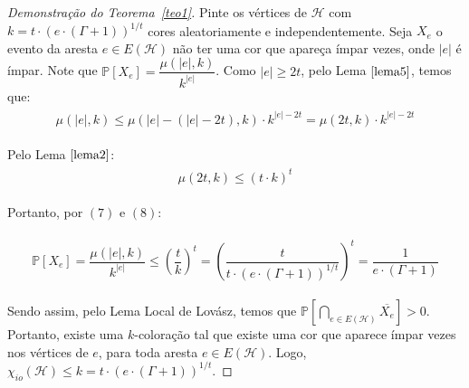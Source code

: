 \begin{proof}[Demonstração do Teorema~\ref{teo1}]
	Pinte os vértices de $\mathcal{H}$ com $k = t {\cdot} (e {\cdot} (\Gamma + 1))^{1/t}$ cores aleatoriamente e independentemente. Seja $X_{e}$ o evento da aresta $e \in E(\mathcal{H})$ não ter uma cor que apareça ímpar vezes, onde $|e|$ é ímpar. Note que $\mathds{P}[X_{e}] = \dfrac{\mu(|e|, k)}{k^{|e|}}$. Como $|e| \geq 2t$, pelo Lema $\ref{lema5}$, temos que: 
	\begin{align}
		\begin{split}
			\mu(|e|, k) \leq \mu(|e| - (|e| - 2t), k) {\cdot} k^{|e| - 2t} = \mu(2t, k) {\cdot} k^{|e| - 2t}
		\end{split} 
	\end{align} 
	
	Pelo Lema $\ref{lema2}$:
	\begin{align}
		\begin{split}
			\mu(2t, k) \leq (t {\cdot } k)^t
		\end{split} 
	\end{align} 
	
	Portanto, por $(7)$ e $(8)$:
	
	\begin{align}
		\begin{split}
			\mathds{P}[X_{e}] = \dfrac{\mu(|e|, k)}{k^{|e|}} 
			\leq \left(\dfrac{t}{k}\right)^t  = \left(\dfrac{t}{t {\cdot}   (e {\cdot} (\Gamma + 1))^{1/t}}\right)^t = \dfrac{1}{e {\cdot} (\Gamma + 1)}
		\end{split} 
	\end{align}
	
	Sendo assim, pelo Lema Local de Lovász, temos que $\mathds{P}[\bigcap\limits_{e \in E(\mathcal{H})} \overline{X_{e}} ] > 0$. Portanto, existe uma $k$-coloração tal que existe uma cor que aparece ímpar vezes nos vértices de $e$, para toda aresta $e \in E(\mathcal{H})$. Logo, $\chi_{io}(\mathcal{H}) \leq k = t {\cdot} (e {\cdot} (\Gamma + 1))^{1/t}$.
	
\end{proof}\newbegin